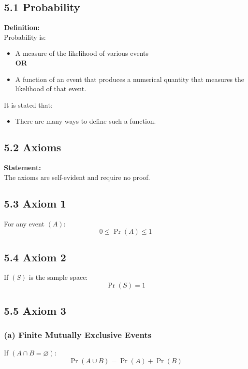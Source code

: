 \documentclass[12pt]{article}
\begin{document}
\subsection*{5.1 Probability}

\textbf{Definition:}\\
Probability is:
\begin{itemize}
  \item A measure of the likelihood of various events\\
  \textbf{OR}
  \item A function of an event that produces a numerical quantity that measures the likelihood of that event.
\end{itemize}

It is stated that:
\begin{itemize}
  \item There are many ways to define such a function.
\end{itemize}

\subsection*{5.2 Axioms}

\textbf{Statement:}\\
The axioms are self-evident and require no proof.

\subsection*{5.3 Axiom 1}

For any event $( A )$:
\[
0 \leq \Pr(A) \leq 1
\]

\subsection*{5.4 Axiom 2}

If $( S )$ is the sample space:
\[
\Pr(S) = 1
\]

\subsection*{5.5 Axiom 3}

\subsubsection*{(a) Finite Mutually Exclusive Events}

If $( A \cap B = \varnothing )$:
\[
\Pr(A \cup B) = \Pr(A) + \Pr(B)
\]
\end{document}
